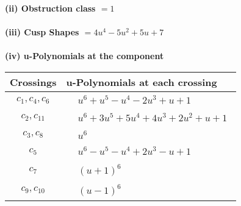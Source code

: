 \documentclass[1p]{elsarticle_modified}
\theoremstyle{definition}
\begin{document}
\flushleft \textbf{(ii) Obstruction class $= 1$}\\~\\
\flushleft \textbf{(iii) Cusp Shapes $= 4 u^4-5 u^2+5 u+7$}\\~\\
\newpage\renewcommand{\arraystretch}{1}
\flushleft \textbf{(iv) u-Polynomials at the component}\newline \\
\begin{tabular}{m{50pt}|m{274pt}}
Crossings & \hspace{64pt}u-Polynomials at each crossing \\
\hline $$\begin{aligned}c_{1},c_{4},c_{6}\end{aligned}$$&$\begin{aligned}
&u^6+u^5- u^4-2 u^3+u+1
\end{aligned}$\\
\hline $$\begin{aligned}c_{2},c_{11}\end{aligned}$$&$\begin{aligned}
&u^6+3 u^5+5 u^4+4 u^3+2 u^2+u+1
\end{aligned}$\\
\hline $$\begin{aligned}c_{3},c_{8}\end{aligned}$$&$\begin{aligned}
&u^6
\end{aligned}$\\
\hline $$\begin{aligned}c_{5}\end{aligned}$$&$\begin{aligned}
&u^6- u^5- u^4+2 u^3- u+1
\end{aligned}$\\
\hline $$\begin{aligned}c_{7}\end{aligned}$$&$\begin{aligned}
&(u+1)^6
\end{aligned}$\\
\hline $$\begin{aligned}c_{9},c_{10}\end{aligned}$$&$\begin{aligned}
&(u-1)^6
\end{aligned}$\\
\hline
\end{tabular}\\~\\
\end{document}
